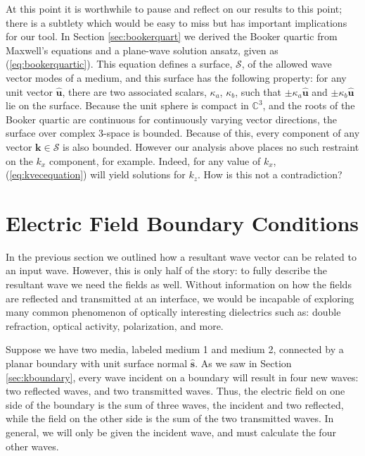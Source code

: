 \documentclass[11pt, reqno]{book}%
\newcounter{ct}
\newcommand{\mbf}{\mathbf}
\newcommand{\mbfg}[1]{\mbf{\mbox{\boldmath$#1$}}}
\newcommand{\mbfh}[1]{\hat{\mbf{#1}}}
\newcommand{\ve}{\varepsilon}
\newcommand{\tens}{\overset{\text{\tiny$\leftrightarrow$}}}
\begin{document}
At this point it is worthwhile to pause and reflect on our results to this point; there is a subtlety which would be easy to miss but has important implications for our tool. In Section \ref{sec:bookerquart} we derived the Booker quartic from Maxwell's equations and a plane-wave solution ansatz, given as (\ref{eq:bookerquartic}). This equation defines a surface, $\mathcal{S}$, of the allowed wave vector modes of a medium, and this surface has the following property: for any unit vector $\mbfh{u}$, there are two associated scalars, $\kappa_a$, $\kappa_b$, such that $\pm \kappa_a \mbfh{u}$ and $\pm \kappa_b \mbfh{u}$ lie on the surface. Because the unit sphere is compact in $\mathbb{C}^3$, and the roots of the Booker quartic are continuous for continuously varying vector directions, the surface over complex 3-space is bounded. Because of this, every component of any vector $\mbf{k}\in\mathcal{S}$ is also bounded. However our analysis above places no such restraint on the $k_x$ component, for example. Indeed, for any value of $k_x$, (\ref{eq:kvecequation}) will yield solutions for $k_z$. How is this not a contradiction? 








\section{Electric Field Boundary Conditions}
\label{sec:Eboundary}

In the previous section we outlined how a resultant wave vector can be related to an input wave. However, this is only half of the story: to fully describe the resultant wave we need the fields as well. Without information on how the fields are reflected and transmitted at an interface, we would be incapable of exploring many common phenomenon of optically interesting dielectrics such as: double refraction, optical activity, polarization, and more.

Suppose we have two media, labeled medium 1 and medium 2, connected by a planar boundary with unit surface normal $\mbfh{s}$. As we saw in Section \ref{sec:kboundary}, every wave incident on a boundary will result in four new waves: two reflected waves, and two transmitted waves. Thus, the electric field on one side of the boundary is the sum of three waves, the incident and two reflected, while the field on the other side is the sum of the two transmitted waves. In general, we will only be given the incident wave, and must calculate the four other waves.
\end{document}
